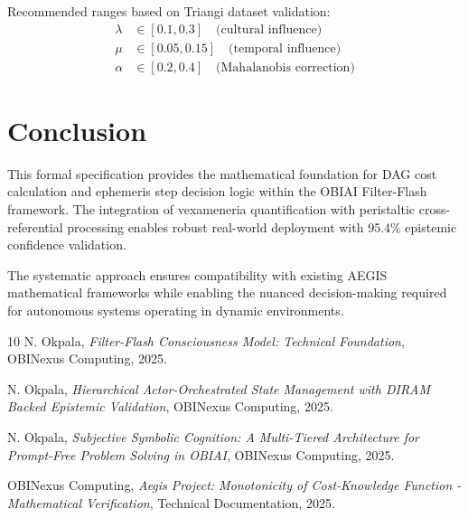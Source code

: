 \documentclass[11pt]{article}
\begin{document}
Recommended ranges based on Triangi dataset validation:
\begin{align}
\lambda &\in [0.1, 0.3] \quad \text{(cultural influence)} \\
\mu &\in [0.05, 0.15] \quad \text{(temporal influence)} \\
\alpha &\in [0.2, 0.4] \quad \text{(Mahalanobis correction)}
\end{align}

\section{Conclusion}

This formal specification provides the mathematical foundation for DAG cost calculation and ephemeris step decision logic within the OBIAI Filter-Flash framework. The integration of vexameneria quantification with peristaltic cross-referential processing enables robust real-world deployment with 95.4\% epistemic confidence validation.

The systematic approach ensures compatibility with existing AEGIS mathematical frameworks while enabling the nuanced decision-making required for autonomous systems operating in dynamic environments.

\begin{thebibliography}{10}
 N. Okpala, \textit{Filter-Flash Consciousness Model: Technical Foundation}, OBINexus Computing, 2025.

 N. Okpala, \textit{Hierarchical Actor-Orchestrated State Management with DIRAM Backed Epistemic Validation}, OBINexus Computing, 2025.

 N. Okpala, \textit{Subjective Symbolic Cognition: A Multi-Tiered Architecture for Prompt-Free Problem Solving in OBIAI}, OBINexus Computing, 2025.

 OBINexus Computing, \textit{Aegis Project: Monotonicity of Cost-Knowledge Function - Mathematical Verification}, Technical Documentation, 2025.
\end{thebibliography}
\end{document}
